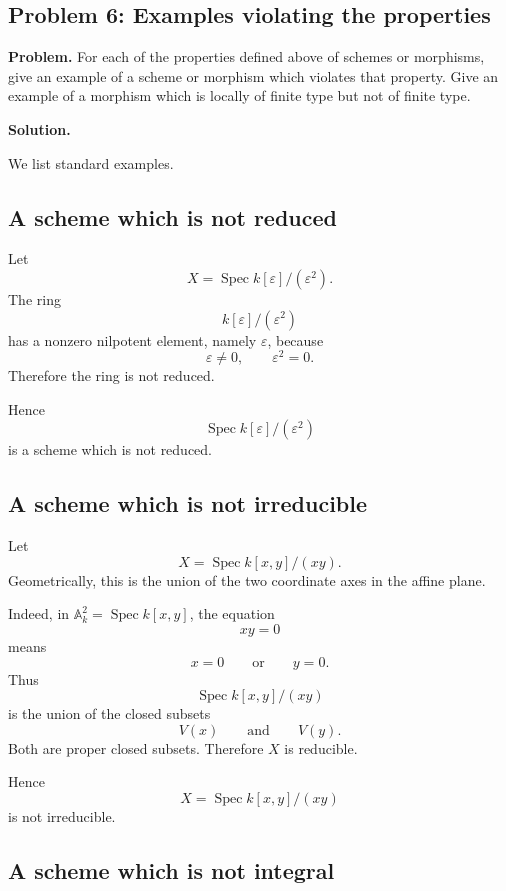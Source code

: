 
\subsection*{Problem 6: Examples violating the properties}

\textbf{Problem.}
For each of the properties defined above of schemes or morphisms, give an example of a scheme or morphism which violates that property. Give an example of a morphism which is locally of finite type but not of finite type.

\bigskip

\textbf{Solution.}

We list standard examples.

\subsection*{A scheme which is not reduced}

Let
\[
X=\operatorname{Spec} k[\varepsilon]/(\varepsilon^2).
\]
The ring
\[
k[\varepsilon]/(\varepsilon^2)
\]
has a nonzero nilpotent element, namely \(\varepsilon\), because
\[
\varepsilon\neq 0,
\qquad
\varepsilon^2=0.
\]
Therefore the ring is not reduced.

Hence
\[
\operatorname{Spec} k[\varepsilon]/(\varepsilon^2)
\]
is a scheme which is not reduced.

\subsection*{A scheme which is not irreducible}

Let
\[
X=\operatorname{Spec} k[x,y]/(xy).
\]
Geometrically, this is the union of the two coordinate axes in the affine plane.

Indeed, in \(\mathbb A_k^2=\operatorname{Spec} k[x,y]\), the equation
\[
xy=0
\]
means
\[
x=0
\qquad\text{or}\qquad
y=0.
\]
Thus
\[
\operatorname{Spec} k[x,y]/(xy)
\]
is the union of the closed subsets
\[
V(x)
\qquad\text{and}\qquad
V(y).
\]
Both are proper closed subsets. Therefore \(X\) is reducible.

Hence
\[
X=\operatorname{Spec} k[x,y]/(xy)
\]
is not irreducible.

\subsection*{A scheme which is not integral}


